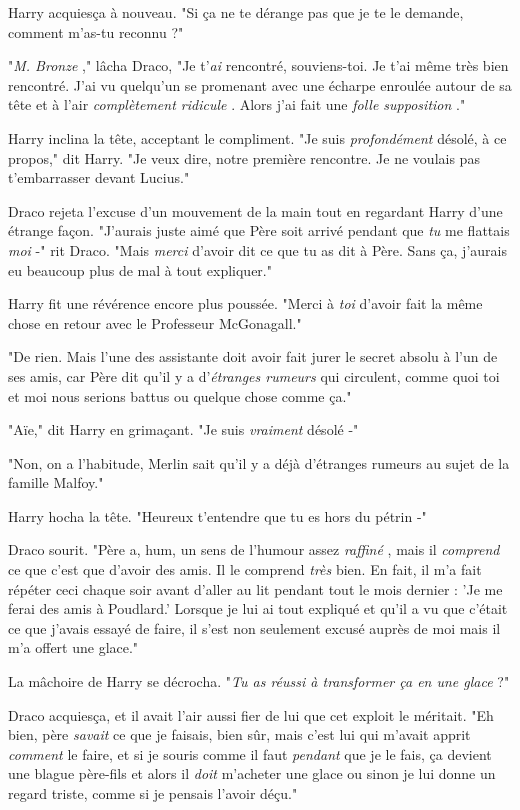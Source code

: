 Harry acquiesça à nouveau. "Si ça ne te dérange pas que je te le demande, comment m'as-tu reconnu ?"

"\emph{M. Bronze} ," lâcha Draco, "Je t'\emph{ai}  rencontré, souviens-toi. Je t'ai même très bien rencontré. J'ai vu quelqu'un se promenant avec une écharpe enroulée autour de sa tête et à l'air \emph{complètement ridicule} . Alors j'ai fait une \emph{folle supposition} ."

Harry inclina la tête, acceptant le compliment. "Je suis \emph{profondément}  désolé, à ce propos," dit Harry. "Je veux dire, notre première rencontre. Je ne voulais pas t'embarrasser devant Lucius."

Draco rejeta l'excuse d'un mouvement de la main tout en regardant Harry d'une étrange façon. "J'aurais juste aimé que Père soit arrivé pendant que \emph{tu}  me flattais \emph{moi}  -" rit Draco. "Mais \emph{merci}  d'avoir dit ce que tu as dit à Père. Sans ça, j'aurais eu beaucoup plus de mal à tout expliquer."

Harry fit une révérence encore plus poussée. "Merci à \emph{toi}  d'avoir fait la même chose en retour avec le Professeur McGonagall."

"De rien. Mais l'une des assistante doit avoir fait jurer le secret absolu à l'un de ses amis, car Père dit qu'il y a d'\emph{étranges rumeurs}  qui circulent, comme quoi toi et moi nous serions battus ou quelque chose comme ça."

"Aïe," dit Harry en grimaçant. "Je suis \emph{vraiment } désolé -"

"Non, on a l'habitude, Merlin sait qu'il y a déjà d'étranges rumeurs au sujet de la famille Malfoy."

Harry hocha la tête. "Heureux t'entendre que tu es hors du pétrin -"

Draco sourit. "Père a, hum, un sens de l'humour assez \emph{raffiné} , mais il \emph{comprend}  ce que c'est que d'avoir des amis. Il le comprend \emph{très}  bien. En fait, il m'a fait répéter ceci chaque soir avant d'aller au lit pendant tout le mois dernier : 'Je me ferai des amis à Poudlard.' Lorsque je lui ai tout expliqué et qu'il a vu que c'était ce que j'avais essayé de faire, il s'est non seulement excusé auprès de moi mais il m'a offert une glace."

La mâchoire de Harry se décrocha. "\emph{Tu as réussi à transformer ça en une glace } ?"

Draco acquiesça, et il avait l'air aussi fier de lui que cet exploit le méritait. "Eh bien, père \emph{savait}  ce que je faisais, bien sûr, mais c'est lui qui m'avait apprit \emph{comment}  le faire, et si je souris comme il faut \emph{pendant}  que je le fais, ça devient une blague père-fils et alors il \emph{doit}  m'acheter une glace ou sinon je lui donne un regard triste, comme si je pensais l'avoir déçu."

